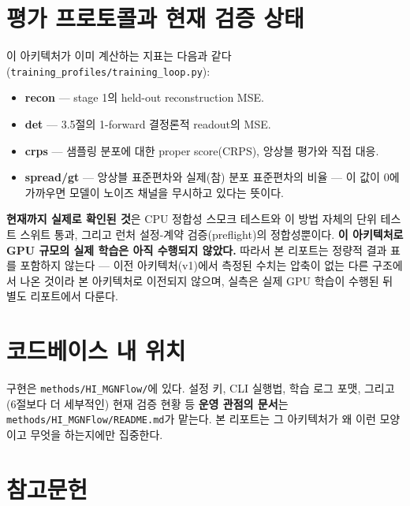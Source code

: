 \documentclass[11pt]{article}
\begin{document}
\section{평가 프로토콜과 현재 검증 상태}

이 아키텍처가 이미 계산하는 지표는 다음과 같다
(\texttt{training\_profiles/training\_loop.py}):

\begin{itemize}
\item \textbf{recon} --- stage 1의 held-out reconstruction MSE.
\item \textbf{det} --- 3.5절의 1-forward 결정론적 readout의 MSE.
\item \textbf{crps} --- 샘플링 분포에 대한 proper score(CRPS), 앙상블
  평가와 직접 대응.
\item \textbf{spread/gt} --- 앙상블 표준편차와 실제(참) 분포 표준편차의
  비율 --- 이 값이 0에 가까우면 모델이 노이즈 채널을 무시하고 있다는
  뜻이다.
\end{itemize}

\textbf{현재까지 실제로 확인된 것}은 CPU 정합성 스모크 테스트와 이 방법
자체의 단위 테스트 스위트 통과, 그리고 런처 설정-계약 검증(preflight)의
정합성뿐이다. \textbf{이 아키텍처로 GPU 규모의 실제 학습은 아직 수행되지
않았다.} 따라서 본 리포트는 정량적 결과 표를 포함하지 않는다 --- 이전
아키텍처(v1)에서 측정된 수치는 압축이 없는 다른 구조에서 나온 것이라 본
아키텍처로 이전되지 않으며, 실측은 실제 GPU 학습이 수행된 뒤 별도
리포트에서 다룬다.

\section{코드베이스 내 위치}

구현은 \texttt{methods/HI\_MGNFlow/}에 있다. 설정 키, CLI 실행법, 학습
로그 포맷, 그리고 (6절보다 더 세부적인) 현재 검증 현황 등 \textbf{운영
관점의 문서}는 \texttt{methods/HI\_MGNFlow/README.md}가 맡는다. 본
리포트는 그 아키텍처가 왜 이런 모양이고 무엇을 하는지에만 집중한다.

\section*{참고문헌}
\end{document}

